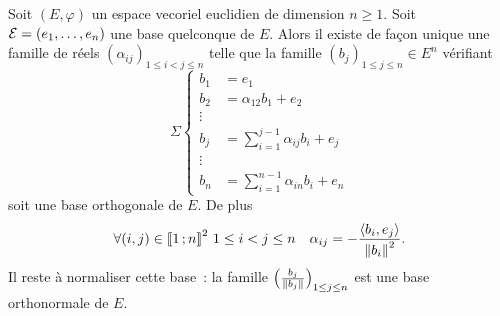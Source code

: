 \begin{theo}
  Soit $(E,\varphi)$ un espace vecoriel euclidien de dimension $n \geq 1$. Soit $\mathcal{E}=(e_1, \ldots, e_n)$ une base quelconque de $E$. Alors il existe de façon unique une famille de réels $(\alpha_{ij})_{1 \leq i<j \leq n}$ telle que la famille $(b_j)_{1 \leq j \leq n} \in E^n$ vérifiant
  \begin{equation} \Sigma
    \begin{cases}
      b_1 & = e_1 \\
      b_2 & = \alpha_{12}b_1 +e_2 \\
      \vdots & \\
      b_j & = \sum_{i=1}^{j-1} \alpha_{ij}b_i  + e_j \\
      \vdots & \\
      b_n & = \sum_{i=1}^{n-1} \alpha_{in}b_i  + e_n
    \end{cases}
  \end{equation}
  soit une base orthogonale de $E$. De plus
  \begin{equation}
    \forall (i,j) \in \mathopen{\llbracket}1\mathclose{}\mathpunct{};n\mathclose{\rrbracket}^2 \ 1 \leq i < j \leq n \quad \alpha_{ij} = -\frac{\left\langle{b_i},{e_j}\right\rangle}{\left\lVert b_i\right\rVert^2}.
  \end{equation}
  Il reste à normaliser cette base~: la famille $\left(\frac{b_j}{\left\lVert b_j\right\rVert}\right)_{1 \leq j \leq n}$ est une base orthonormale de $E$.
\end{theo}
